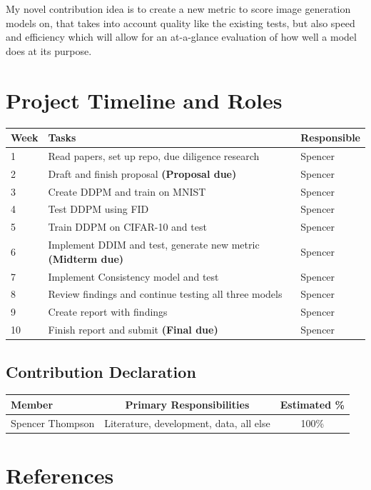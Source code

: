 \documentclass[11pt, letterpaper]{article}
\begin{document}
My novel contribution idea is to create a new metric to score image generation models on, that takes into account quality like the existing tests, but also speed and efficiency which will allow for an at-a-glance evaluation of how well a model does at its purpose.

\section{Project Timeline and Roles}

\begin{center}
\begin{tabular}{lp{7cm}l}
\toprule
\textbf{Week} & \textbf{Tasks} & \textbf{Responsible} \\
\midrule
1 & Read papers, set up repo, due diligence research & Spencer \\
2 & Draft and finish proposal \textbf{(Proposal due)} & Spencer \\
3 & Create DDPM and train on MNIST & Spencer \\
4 & Test DDPM using FID & Spencer \\
5 & Train DDPM on CIFAR-10 and test & Spencer \\
6 & Implement DDIM and test, generate new metric \textbf{(Midterm due)} & Spencer \\
7 & Implement Consistency model and test & Spencer \\
8 & Review findings and continue testing all three models & Spencer \\
9 & Create report with findings & Spencer \\
10 & Finish report and submit \textbf{(Final due)} & Spencer \\
\bottomrule
\end{tabular}
\end{center}

\subsection{Contribution Declaration}

\begin{tabular}{lcc}
\toprule
\textbf{Member} & \textbf{Primary Responsibilities} & \textbf{Estimated \%} \\
\midrule
{Spencer Thompson} & Literature, development, data, all else & 100\%  \\
\bottomrule
\end{tabular}

\section{References}
\end{document}
